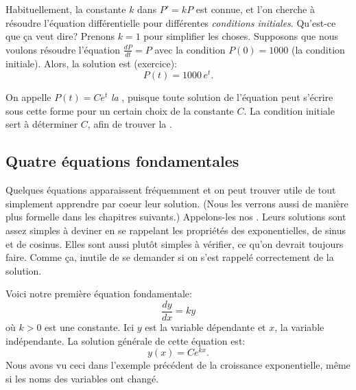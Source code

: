 Habituellement, la constante $k$ dans $P' = kP$ est connue, et l'on cherche à résoudre l'équation différentielle pour différentes \emph{conditions initiales}.  Qu'est-ce que \c{c}a veut dire?  Prenons $k=1$ pour simplifier les choses.  Supposons que nous voulons résoudre l'équation 
$\frac{dP}{dt} = P$ 
avec la condition $P(0) = 1000$ (la condition initiale).
Alors, la solution est (exercice): 
\begin{equation*}
P(t) = 1000 \, e^t .
\end{equation*}



On appelle $P(t) = C e^t$ \emph{la },
puisque toute solution de l'équation peut s'écrire sous cette forme pour un certain choix de la constante $C$.  La condition initiale sert à déterminer $C$, afin de trouver la 
\emph{}.  

\subsection{Quatre équations fondamentales} \label{subsection:fourfundamental}

Quelques équations apparaissent fréquemment et on peut trouver utile de tout simplement apprendre par coeur leur solution.  (Nous les verrons aussi de manière plus formelle dans les chapitres suivants.)  Appelons-les nos . Leurs solutions sont assez simples à deviner en se rappelant les propriétés des exponentielles, de sinus et de cosinus.  Elles sont aussi plutôt simples à vérifier, ce qu'on devrait toujours faire.  Comme \c{c}a, inutile de se demander si on s'est rappelé correctement de la solution.

\medskip

Voici notre première équation fondamentale: 
\begin{equation*}
\frac{dy}{dx} = k y 
\end{equation*}
où $k > 0$ est une constante.
Ici $y$ est la variable dépendante et $x$, la variable indépendante.
La solution générale de cette équation est: 
\begin{equation*}
y(x) = C e^{kx} .
\end{equation*}
Nous avons vu ceci dans l'exemple précédent de la croissance exponentielle, même si les noms des variables ont changé.

